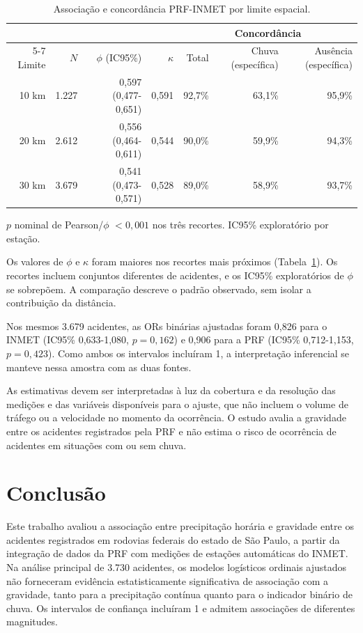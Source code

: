 \documentclass[12pt]{article}
\begin{document}
\begin{table}[H]
    \centering
    \caption{Associação e concordância PRF-INMET por limite espacial.}
    \label{tab:concordancia}
    \footnotesize
    \begin{tabular}{rrrrrrr}
        \toprule
        & & & & \multicolumn{3}{c}{Concordância} \\
        \cmidrule(lr){5-7}
        Limite & $N$ & $\phi$ (IC95\%) & $\kappa$ & Total & Chuva (específica) & Ausência (específica) \\
        \midrule
        10 km & 1.227 & 0,597 (0,477-0,651) & 0,591 & 92,7\% & 63,1\% & 95,9\% \\
        20 km & 2.612 & 0,556 (0,464-0,611) & 0,544 & 90,0\% & 59,9\% & 94,3\% \\
        30 km & 3.679 & 0,541 (0,473-0,571) & 0,528 & 89,0\% & 58,9\% & 93,7\% \\
        \bottomrule
    \end{tabular}
    \par\smallskip
    {\footnotesize $p$ nominal de Pearson/$\phi$ $<0{,}001$ nos três recortes.
    IC95\% exploratório por estação.}
\end{table}

Os valores de $\phi$ e $\kappa$ foram maiores nos recortes mais
próximos (Tabela~\ref{tab:concordancia}). Os recortes incluem
conjuntos diferentes de acidentes, e os IC95\% exploratórios de
$\phi$ se sobrepõem. A comparação descreve o padrão observado,
sem isolar a contribuição da distância.

Nos mesmos 3.679 acidentes, as ORs binárias ajustadas foram 0,826
para o INMET (IC95\% 0,633-1,080, $p=0{,}162$) e 0,906 para a
PRF (IC95\% 0,712-1,153, $p=0{,}423$). Como ambos os intervalos
incluíram 1, a interpretação inferencial se manteve nessa amostra
com as duas fontes.

As estimativas devem ser interpretadas à luz da cobertura e da
resolução das medições e das variáveis disponíveis para o ajuste,
que não incluem o volume de tráfego ou a velocidade no momento da
ocorrência. O estudo avalia a gravidade entre os acidentes
registrados pela PRF e não estima o risco de ocorrência de acidentes
em situações com ou sem chuva.

\section{Conclusão}

Este trabalho avaliou a associação entre precipitação horária e gravidade
entre os acidentes registrados em rodovias federais do estado de São Paulo,
a partir da integração de dados da PRF com medições de estações automáticas
do INMET. Na análise principal de 3.730 acidentes, os modelos logísticos
ordinais ajustados não forneceram evidência estatisticamente significativa
de associação com a gravidade, tanto para a precipitação contínua quanto
para o indicador binário de chuva. Os intervalos de confiança incluíram 1
e admitem associações de diferentes magnitudes.
\end{document}
